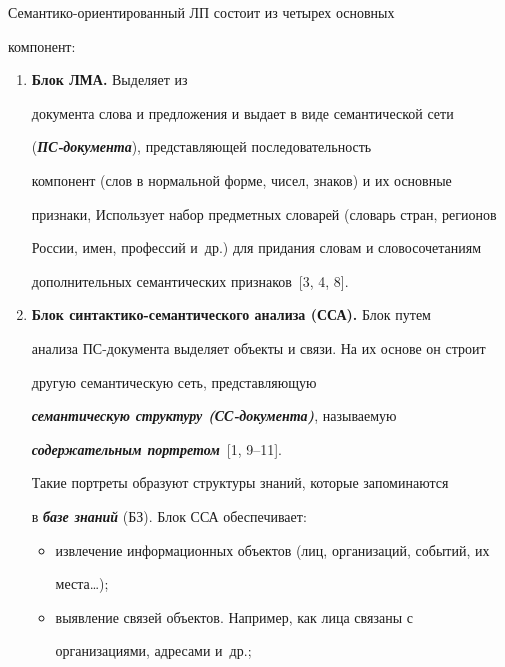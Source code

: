   


\vspace*{-2pt}


  


   Семантико-ориентированный ЛП состоит из четырех основных 


компонент:


\begin{enumerate}


\item \textbf{Блок ЛМА.} Выделяет из 


документа слова и предложения и выдает в виде семантической сети 


({\bfseries\textit{ПС-документа}}), представляющей последовательность 


компонент (слов в нормальной форме, чисел, знаков) и их основные 


признаки, Использует набор предметных словарей (словарь стран, регионов 


России, имен, профессий и~др.) для придания словам и словосочетаниям 


дополнительных  семантических признаков~[3, 4, 8].





\item \textbf{Блок синтактико-семантического анализа (ССА).} Блок путем 


анализа ПС-документа выделяет объекты и связи. На их основе он строит 


другую семантическую сеть, представляющую 


{\bfseries\textit{семантическую структуру (СС-до\-ку\-мен\-та)}}, называемую 


{\bfseries\textit{содержательным портретом}}~[1, 9--11]. 


Такие портреты образуют структуры знаний, которые запоминаются 


в {\bfseries\textit{базе знаний}} (БЗ). Блок ССА обеспечивает:


\begin{itemize}


\item извлечение информационных объектов (лиц, организаций, событий, их 


места\ldots);


\item выявление связей объектов. Например, как лица связаны с 


организациями, адресами и~др.;



\end{itemize}
\end{enumerate}
